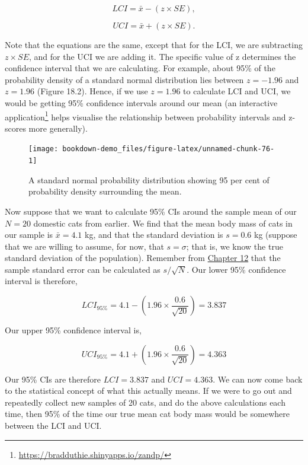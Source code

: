 \documentclass[
  openany]{scrbook}
\begin{document}
\[LCI = \bar{x} - (z \times SE),\]

\[UCI = \bar{x} + (z \times SE).\]

Note that the equations are the same, except that for the LCI, we are subtracting \(z \times SE\), and for the UCI we are adding it.
The specific value of z determines the confidence interval that we are calculating.
For example, about 95\% of the probability density of a standard normal distribution lies between \(z = -1.96\) and \(z = 1.96\) (Figure 18.2).
Hence, if we use \(z = 1.96\) to calculate LCI and UCI, we would be getting 95\% confidence intervals around our mean (an interactive application\footnote{\url{https://bradduthie.shinyapps.io/zandp/}} helps visualise the relationship between probability intervals and z-scores more generally).

\begin{figure}
\texttt{[image: bookdown-demo\_files/figure-latex/unnamed-chunk-76-1]} \caption{A standard normal probability distribution showing 95 per cent of probability density surrounding the mean.}\label{fig:unnamed-chunk-76}
\end{figure}

Now suppose that we want to calculate 95\% CIs around the sample mean of our \(N = 20\) domestic cats from earlier.
We find that the mean body mass of cats in our sample is \(\bar{x} = 4.1\) kg, and that the standard deviation is \(s = 0.6\) kg (suppose that we are willing to assume, for now, that \(s = \sigma\); that is, we know the true standard deviation of the population).
Remember from \protect\hyperlink{Chapter_12}{Chapter 12} that the sample standard error can be calculated as \(s / \sqrt{N}\).
Our lower 95\% confidence interval is therefore,

\[LCI_{95\%} = 4.1 - \left(1.96 \times \frac{0.6}{\sqrt{20}}\right) = 3.837\]

Our upper 95\% confidence interval is,

\[UCI_{95\%} = 4.1 + \left(1.96 \times \frac{0.6}{\sqrt{20}}\right) = 4.363\]

Our 95\% CIs are therefore \(LCI = 3.837\) and \(UCI = 4.363\).
We can now come back to the statistical concept of what this actually means.
If we were to go out and repeatedly collect new samples of 20 cats, and do the above calculations each time, then 95\% of the time our true mean cat body mass would be somewhere between the LCI and UCI.
\end{document}
